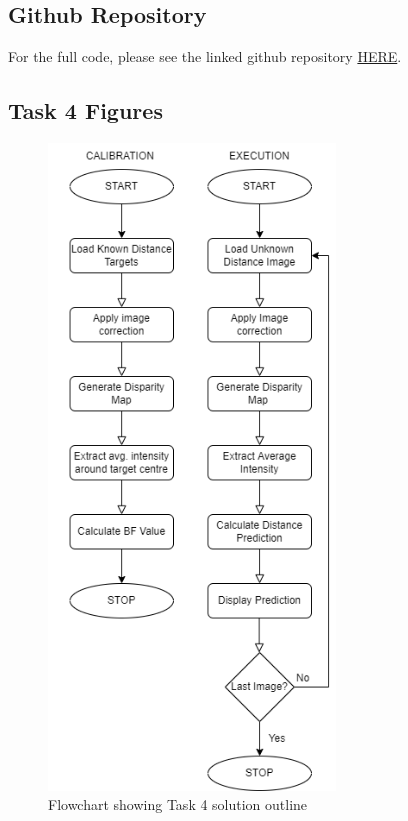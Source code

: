 \documentclass[conference]{IEEEtran}
\begin{document}
\printbibliography


\onecolumn
\subsection{Github Repository}
For the full code, please see the linked github repository \href{https://github.com/jjpendlebury/AINT308-Coursework}{HERE}.
\subsection{Task 4 Figures}\label{app:T4}
\begin{figure}[H]
\centering
\includegraphics[width=3in]{Task4.drawio}
\caption{Flowchart showing Task 4 solution outline}
\label{fig:flowchart4}
\end{figure}
\end{document}
